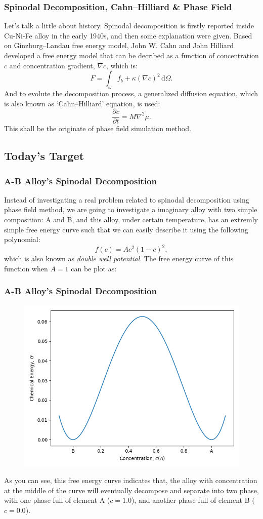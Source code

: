 \documentclass[compress,xcolor={dvipsnames}]{beamer}
\begin{document}
\begin{frame}
    \frametitle{Spinodal Decomposition, Cahn--Hilliard \& Phase Field}

    Let's talk a little about history. Spinodal decomposition is firstly reported inside Cu-Ni-Fe alloy in the early 1940s, and then some explanation were given. Based on Ginzburg--Landau free energy model, John W. Cahn and John Hilliard developed a free energy model that can be decribed as a function of concentration \(c\) and concentration gradient, \(\nabla c\), which is:
    \[
        F = \int_\omega f_b + \kappa \left( \nabla c \right)^2 \,\mathrm{d}\Omega.
    \]
    And to evolute the decomposition process, a generalized diffusion equation, which is also known as `Cahn--Hilliard' equation, is used:
    \[
        \frac{\partial c}{\partial t} = M \nabla^2 \mu.
    \]
    This shall be the originate of phase field simulation method.

\end{frame}

\subsection{Today's Target}
\begin{frame}
    \frametitle{A-B Alloy's Spinodal Decomposition}

    Instead of investigating a real problem related to spinodal decomposition using phase field method, we are going to investigate a imaginary alloy with two simple composition: A and B, and this alloy, under certain temperature, has an extremly simple free energy curve such that we can easily describe it using the following polynomial:
    \[
        f(c) = Ac^2(1-c)^2,
    \]
    which is also known as \emph{double well potential}.  The free energy curve of this function when \(A = 1\) can be plot as:

\end{frame}

\begin{frame}
    \frametitle{A-B Alloy's Spinodal Decomposition}
    \begin{figure}
        \includegraphics[width=0.5\linewidth]{pic/AB_free_energy.png}
    \end{figure}
    \vspace{-5pt}
    As you can see, this free energy curve indicates that, the alloy with concentration at the middle of the curve will eventually decompose and separate into two phase, with one phase full of element A (\(c = 1.0\)), and another phase full of element B (\(c = 0.0\)).

\end{frame}
\end{document}
